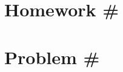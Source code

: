 \documentclass[letterpaper, 12pt]{report}
\begin{document}
\rhead{\textbf{\today}}

\section*{Homework \#}

\section*{Problem \#}
\end{document}
